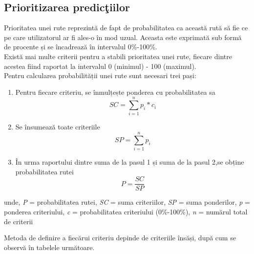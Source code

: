 		\subsection{Prioritizarea predicţiilor}
		Prioritatea unei rute reprezintă de fapt de probabilitatea ca această rută să fie ce pe care utilizatorul ar fi ales-o în mod uzual. Aceasta este exprimată sub formă de procente și se încadrează în intervalul 0\%-100\%.
		\vspace{6pt}
		\\Există mai multe criterii pentru a stabili prioritatea unei rute, fiecare dintre acestea fiind raportat la intervalul 0 (minimul) - 100 (maximul).  
		\vspace{6pt}
	    \\Pentru calcularea probabilității unei rute sunt necesari trei pași: 
	    
	    \begin{enumerate}
	     \setlength\itemsep{0em}
		 \item Pentru fiecare criteriu, se înmulțește ponderea cu probabilitatea sa 
		 \begin{equation}\label{qoat1}
		  SC = \sum_{i=1}^{n} p_{i}*c_{i}
		 \end{equation}
	     \item Se însumează toate criteriile  
		  \begin{equation}\label{qoat2}	      
	       SP = \sum_{i=1}^{n} p_{i}
	      \end{equation}
	     \item În urma raportului dintre suma de la pasul 1 și suma de la pasul 2,se obține probabilitatea rutei
	    \begin{equation}\label{qoat}	   
	     P = \frac{SC}{SP}
	    \end{equation}
    	\end{enumerate}
    	
		unde, \textit{P} = probabilitatea rutei, \textit{SC} = suma criteriilor, \textit{SP} = suma ponderilor, \textit{p} = ponderea criteriului, \textit{c} = probabilitatea criteriului (0\%-100\%), \textit{n} = numărul total de criterii	
		
		\vspace{6pt}
	    Metoda de definire a fiecărui criteriu depinde de criteriile însăși, după cum se observă în tabelele următoare.
		
